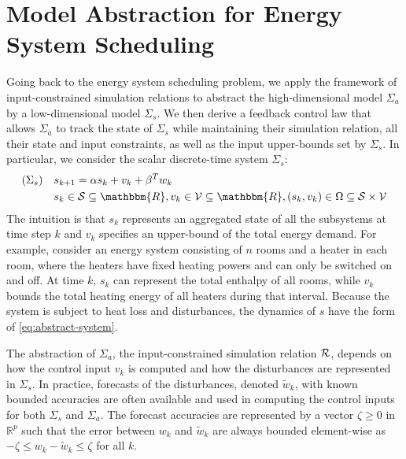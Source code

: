 \section{Model Abstraction for Energy System Scheduling}%
\label{sec:abstraction-gs}

Going back to the %
energy system scheduling problem, we apply the framework of input-constrained simulation relations to abstract the high-dimensional model $\Sigma_{a}$ by a low-dimensional model $\Sigma_{s}$.
We then derive a feedback control law that allows $\Sigma_{a}$ to track the state of $\Sigma_{s}$ while maintaining their simulation relation, all their state and input constraints, as well as the input upper-bounds set by $\Sigma_{s}$.
In particular, we consider the scalar discrete-time system $\Sigma_{s}$:
\begin{align}
  (\Sigma_s) \quad
  & s_{k + 1} = \alpha s_k + v_k + \beta^T w_{k}   \label{eq:abstract-system} \\
  & s_k \in \SSet \subseteq \mathbbm{R},
  v_k \in \VSet \subseteq \mathbbm{R},
  (s_k, v_k) \in \Omega \subseteq \SSet \times \VSet \nonumber
 \end{align}
%
The intuition is that $s_{k}$ represents an aggregated state of all the subsystems at time step $k$ and $v_{k}$ specifies an upper-bound of the total energy demand.
For example, consider an energy system consisting of $n$ rooms and a heater in each room, where the heaters have fixed heating powers and can only be switched on and off.
At time $k$, $s_{k}$ can represent the total enthalpy of all rooms, while $v_{k}$ bounds the total heating energy of all heaters during that interval.
Because the system is subject to heat loss and disturbances, the dynamics of $s$ have the form of \eqref{eq:abstract-system}.

The abstraction of $\Sigma_{a}$, \ie the input-constrained simulation relation $\mathcal{R}$, depends on how the control input $v_{k}$ is computed and how the disturbances are represented in $\Sigma_{s}$.
In practice, forecasts of the disturbances, denoted $\tilde{w}_{k}$, with known bounded accuracies are often available and used in computing the control inputs for both $\Sigma_{s}$ and $\Sigma_{a}$.
The forecast accuracies are represented by a vector $\zeta \geq 0$ in $\mathbb{R}^{p}$ such that the error between $w_{k}$ and $\tilde{w}_{k}$ are always bounded element-wise as $-\zeta \leqslant w_{k} - \tilde{w}_{k} \leqslant \zeta$ for all $k$.


